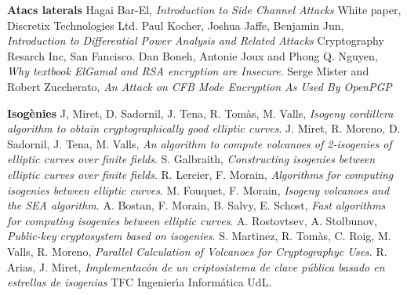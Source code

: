 \documentclass[12pt,twoside,catalan,a4paper]{book}%
\numberwithin{figure}{section}		%
\theoremstyle{definition}   			%
\theoremstyle{saltolinea}   			%
\begin{document}
\begin{thebibliography}{1}
\vspace{5mm}
 {\large\bf Atacs laterals}
 Hagai Bar-El, \textit{Introduction to Side Channel Attacks} White paper, Discretix Technologies Ltd.
 Paul Kocher, Joshua Jaffe, Benjamin Jun, \textit{Introduction to Differential Power Analysis and Related Attacks} Cryptography Resarch Inc, San Fancisco.
 Dan Boneh, Antonie Joux and Phong Q. Nguyen, \textit{Why textbook ElGamal and RSA encryption are Insecure}.
 Serge Mister and Robert Zuccherato, \textit{An Attack on CFB Mode Encryption As Used By OpenPGP}

\vspace{5mm}
 {\large\bf Isog\`enies}
 J, Miret, D. Sadornil, J. Tena, R. Tom\`as, M. Valls, \textit{Isogeny cordillera algorithm to obtain cryptographically good elliptic curves}.
 J. Miret, R. Moreno, D. Sadornil, J. Tena, M. Valls, \textit{An algorithm to compute volcanoes of 2-isogenies of elliptic curves over finite fields}.
 S. Galbraith, \textit{Constructing isogenies between elliptic curves over finite fields}.
 R. Lercier, F. Morain, \textit{Algorithms for computing isogenies between elliptic curves}.
 M. Fouquet, F. Morain, \textit{Isogeny volcanoes and the SEA algorithm}.
 A. Bostan, F. Morain, B. Salvy, E. Schost, \textit{Fast algorithms for computing isogenies between elliptic curves}.
 A. Rostovtsev, A. Stolbunov, \textit{Public-key cryptosystem based on isogenies}.
 S. Martinez, R. Tom\`as, C. Roig, M. Valls, R. Moreno, \textit{Parallel Calculation of Volcanoes for Cryptographyc Uses}.
 R. Arias, J. Miret, \textit{Implementac\'on de un criptosistema de clave p\'ublica basado en estrellas de isogenias} TFC Ingenier\'{\i}a Inform\'atica UdL.

\end{thebibliography}
\end{document}
